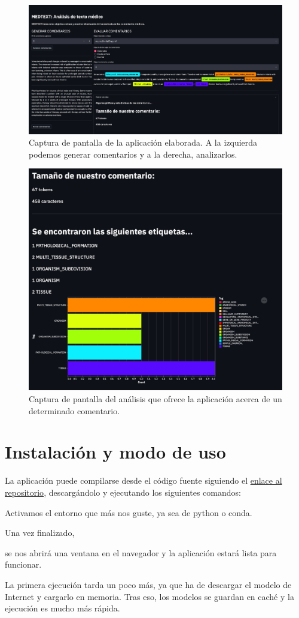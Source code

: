 \begin{figure}[h]
	\centering
	\includegraphics[width=.9\textwidth]{media/app_demo.jpeg}
	\caption{Captura de pantalla de la aplicación elaborada. A la izquierda podemos generar comentarios y a la derecha, analizarlos.}
	\label{fig:app-demo}
\end{figure}


\begin{figure}[b]
	\centering
	\includegraphics[width=.62\textwidth]{media/analysis_comment.jpeg}
	\caption{Captura de pantalla del análisis que ofrece la aplicación acerca de un determinado comentario.}
	\label{fig:analysis-comment}
\end{figure}



\section{Instalación y modo de uso}
La aplicación puede compilarse desde el código fuente siguiendo el \href{https://github.com/jesi-rgb/medical-text-analysis}{enlace al repositorio}, descargándolo y ejecutando los siguientes comandos:


Activamos el entorno que más nos guste, ya sea de python o conda.



Una vez finalizado, 


se nos abrirá una ventana en el navegador y la aplicación estará lista para funcionar.

La primera ejecución tarda un poco más, ya que ha de descargar el modelo de Internet y cargarlo en memoria. Tras eso, los modelos se guardan en caché y la ejecución es mucho más rápida.
